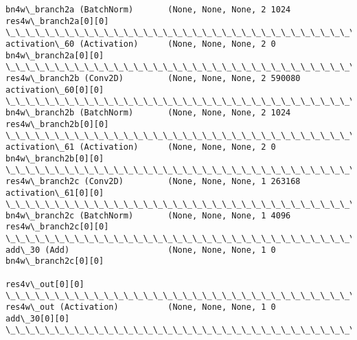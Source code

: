 \documentclass[11pt]{article}
\begin{document}
\begin{Verbatim}[commandchars=\\\{\}]
bn4w\_branch2a (BatchNorm)       (None, None, None, 2 1024        res4w\_branch2a[0][0]             
\_\_\_\_\_\_\_\_\_\_\_\_\_\_\_\_\_\_\_\_\_\_\_\_\_\_\_\_\_\_\_\_\_\_\_\_\_\_\_\_\_\_\_\_\_\_\_\_\_\_\_\_\_\_\_\_\_\_\_\_\_\_\_\_\_\_\_\_\_\_\_\_\_\_\_\_\_\_\_\_\_\_\_\_\_\_\_\_\_\_\_\_\_\_\_\_\_\_
activation\_60 (Activation)      (None, None, None, 2 0           bn4w\_branch2a[0][0]              
\_\_\_\_\_\_\_\_\_\_\_\_\_\_\_\_\_\_\_\_\_\_\_\_\_\_\_\_\_\_\_\_\_\_\_\_\_\_\_\_\_\_\_\_\_\_\_\_\_\_\_\_\_\_\_\_\_\_\_\_\_\_\_\_\_\_\_\_\_\_\_\_\_\_\_\_\_\_\_\_\_\_\_\_\_\_\_\_\_\_\_\_\_\_\_\_\_\_
res4w\_branch2b (Conv2D)         (None, None, None, 2 590080      activation\_60[0][0]              
\_\_\_\_\_\_\_\_\_\_\_\_\_\_\_\_\_\_\_\_\_\_\_\_\_\_\_\_\_\_\_\_\_\_\_\_\_\_\_\_\_\_\_\_\_\_\_\_\_\_\_\_\_\_\_\_\_\_\_\_\_\_\_\_\_\_\_\_\_\_\_\_\_\_\_\_\_\_\_\_\_\_\_\_\_\_\_\_\_\_\_\_\_\_\_\_\_\_
bn4w\_branch2b (BatchNorm)       (None, None, None, 2 1024        res4w\_branch2b[0][0]             
\_\_\_\_\_\_\_\_\_\_\_\_\_\_\_\_\_\_\_\_\_\_\_\_\_\_\_\_\_\_\_\_\_\_\_\_\_\_\_\_\_\_\_\_\_\_\_\_\_\_\_\_\_\_\_\_\_\_\_\_\_\_\_\_\_\_\_\_\_\_\_\_\_\_\_\_\_\_\_\_\_\_\_\_\_\_\_\_\_\_\_\_\_\_\_\_\_\_
activation\_61 (Activation)      (None, None, None, 2 0           bn4w\_branch2b[0][0]              
\_\_\_\_\_\_\_\_\_\_\_\_\_\_\_\_\_\_\_\_\_\_\_\_\_\_\_\_\_\_\_\_\_\_\_\_\_\_\_\_\_\_\_\_\_\_\_\_\_\_\_\_\_\_\_\_\_\_\_\_\_\_\_\_\_\_\_\_\_\_\_\_\_\_\_\_\_\_\_\_\_\_\_\_\_\_\_\_\_\_\_\_\_\_\_\_\_\_
res4w\_branch2c (Conv2D)         (None, None, None, 1 263168      activation\_61[0][0]              
\_\_\_\_\_\_\_\_\_\_\_\_\_\_\_\_\_\_\_\_\_\_\_\_\_\_\_\_\_\_\_\_\_\_\_\_\_\_\_\_\_\_\_\_\_\_\_\_\_\_\_\_\_\_\_\_\_\_\_\_\_\_\_\_\_\_\_\_\_\_\_\_\_\_\_\_\_\_\_\_\_\_\_\_\_\_\_\_\_\_\_\_\_\_\_\_\_\_
bn4w\_branch2c (BatchNorm)       (None, None, None, 1 4096        res4w\_branch2c[0][0]             
\_\_\_\_\_\_\_\_\_\_\_\_\_\_\_\_\_\_\_\_\_\_\_\_\_\_\_\_\_\_\_\_\_\_\_\_\_\_\_\_\_\_\_\_\_\_\_\_\_\_\_\_\_\_\_\_\_\_\_\_\_\_\_\_\_\_\_\_\_\_\_\_\_\_\_\_\_\_\_\_\_\_\_\_\_\_\_\_\_\_\_\_\_\_\_\_\_\_
add\_30 (Add)                    (None, None, None, 1 0           bn4w\_branch2c[0][0]              
                                                                 res4v\_out[0][0]                  
\_\_\_\_\_\_\_\_\_\_\_\_\_\_\_\_\_\_\_\_\_\_\_\_\_\_\_\_\_\_\_\_\_\_\_\_\_\_\_\_\_\_\_\_\_\_\_\_\_\_\_\_\_\_\_\_\_\_\_\_\_\_\_\_\_\_\_\_\_\_\_\_\_\_\_\_\_\_\_\_\_\_\_\_\_\_\_\_\_\_\_\_\_\_\_\_\_\_
res4w\_out (Activation)          (None, None, None, 1 0           add\_30[0][0]                     
\_\_\_\_\_\_\_\_\_\_\_\_\_\_\_\_\_\_\_\_\_\_\_\_\_\_\_\_\_\_\_\_\_\_\_\_\_\_\_\_\_\_\_\_\_\_\_\_\_\_\_\_\_\_\_\_\_\_\_\_\_\_\_\_\_\_\_\_\_\_\_\_\_\_\_\_\_\_\_\_\_\_\_\_\_\_\_\_\_\_\_\_\_\_\_\_\_\_

\end{Verbatim}
\end{document}
